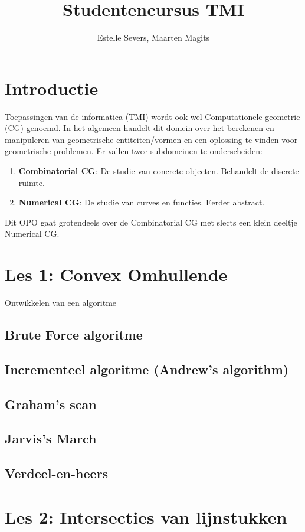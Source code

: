 \documentclass[12pt,a4paper]{article}
\author{Estelle Severs, Maarten Magits}
\title{Studentencursus TMI}
\newenvironment{sidenote}
{
	\begin{center}
		\begin{mdframed}[backgroundcolor=BurntOrange, roundcorner=10pt, linewidth= 0pt]
		}
		{
		\end{mdframed}
	\end{center}
}
\begin{document}
	\maketitle
	\section{Introductie}
	Toepassingen van de informatica (TMI) wordt ook wel Computationele geometrie (CG) genoemd.
	In het algemeen handelt dit domein over het berekenen en manipuleren van geometrische entiteiten/vormen en een oplossing te vinden voor geometrische problemen.
	Er vallen twee subdomeinen te onderscheiden:
	\begin{enumerate}
		\item \textbf{Combinatorial CG}: De studie van concrete objecten. Behandelt de discrete ruimte.
		\item \textbf{Numerical CG}: De studie van curves en functies. Eerder abstract.
	\end{enumerate}
	Dit OPO gaat grotendeels over de Combinatorial CG met slects een klein deeltje Numerical CG.
	
	\section{Les 1: Convex Omhullende}
	\begin{sidenote}
		Ontwikkelen van een algoritme
	\end{sidenote}
	\subsection{Brute Force algoritme}
	\subsection{Incrementeel algoritme 	(Andrew's algorithm)}
	\subsection{Graham's scan}
	\subsection{Jarvis's March}
	\subsection{Verdeel-en-heers}
	\section{Les 2: Intersecties van lijnstukken}
\end{document}
